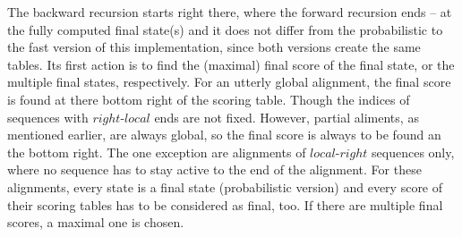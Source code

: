 \documentclass[a4paper,10pt]{thesis}
\newcommand{\lR}{$local\texttt{-}right$}
\begin{document}
{{{      The backward recursion starts right there, where the forward recursion ends -- at the fully computed final state(s) and it does not differ from the probabilistic to the fast version of this implementation, since both versions create the same tables. Its first action is to find the (maximal) final score of the final state, or the multiple final states, respectively. For an utterly global alignment, the final score is found at there bottom right of the scoring table. Though the indices of sequences with $right$-$local$ ends are not fixed. However, partial aliments, as mentioned earlier, are always global, so the final score is always to be found an the bottom right. The one exception are alignments of \lR{} sequences only, where no sequence has to stay active to the end of the alignment. For these alignments, every state is a final state (probabilistic version) and every score of their scoring tables has to be considered as final, too. If there are multiple final scores, a maximal one is chosen.
      }}}
\end{document}
